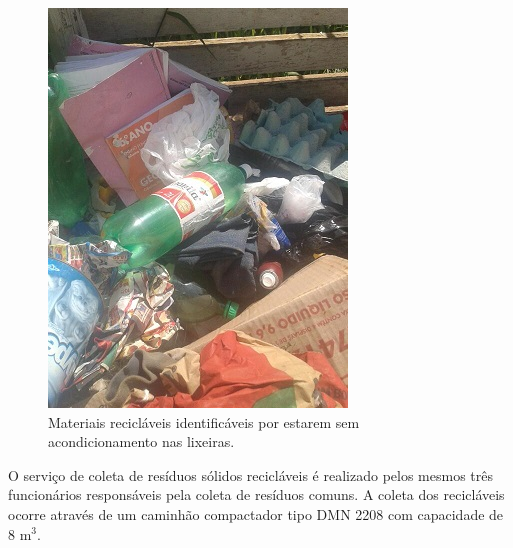 \begin{figure}
	\centering
	\includegraphics[width=0.5\linewidth]{produtos/prodtres/image043}
	\caption{Materiais recicláveis identificáveis por estarem sem acondicionamento nas lixeiras.}
	\label{fig:image043}
\end{figure}

O serviço de coleta de resíduos sólidos recicláveis é realizado pelos mesmos três funcionários responsáveis pela coleta de resíduos comuns. A coleta dos recicláveis ocorre através de um caminhão compactador tipo DMN 2208 com capacidade de 8 m$^{3}$.

